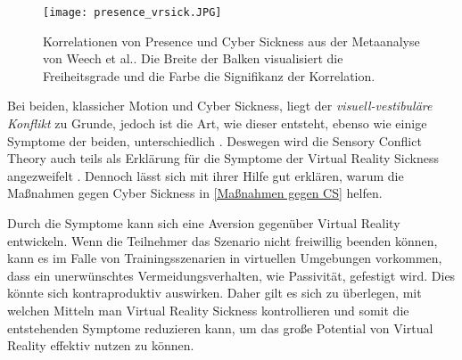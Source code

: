 \begin{figure}[h]
	\centering 
	\texttt{[image: presence\_vrsick.JPG]}
	\caption{Korrelationen von Presence und Cyber Sickness aus der Metaanalyse von Weech et al.\cite{Weech:2019:PresenceCS}. Die Breite der Balken visualisiert die Freiheitsgrade und die Farbe die Signifikanz der Korrelation.}
	\label{abb:presence_vrsick}
\end{figure}

Bei beiden, klassicher Motion und Cyber Sickness, liegt der \textit{visuell-vestibul\"are Konflikt} zu Grunde, jedoch ist die Art, wie dieser entsteht, ebenso wie einige Symptome der beiden, unterschiedlich \cite{Stanney:1997:MSCSSS}. Deswegen wird die Sensory Conflict Theory auch teils als Erkl\"arung f\"ur die Symptome der Virtual Reality Sickness angezweifelt  \cite{Kolasinski:1998:SympCS}. Dennoch l\"asst sich mit ihrer Hilfe gut erkl\"aren, warum die Ma{\ss}nahmen gegen Cyber Sickness in  \autoref{Maßnahmen gegen CS} helfen.

Durch die Symptome kann sich eine Aversion gegen\"uber Virtual Reality entwickeln. Wenn die Teilnehmer das Szenario nicht freiwillig beenden k\"onnen, kann es im Falle von Trainingsszenarien in virtuellen Umgebungen vorkommen, dass ein unerw\"unschtes Vermeidungsverhalten, wie Passivit\"at, gefestigt wird\cite{Crowley:1987:Avoid}. Dies k\"onnte sich kontraproduktiv auswirken. Daher gilt es sich zu \"uberlegen, mit welchen Mitteln man Virtual Reality Sickness kontrollieren und somit die entstehenden Symptome reduzieren kann, um das gro{\ss}e Potential von Virtual Reality effektiv nutzen zu k\"onnen.

